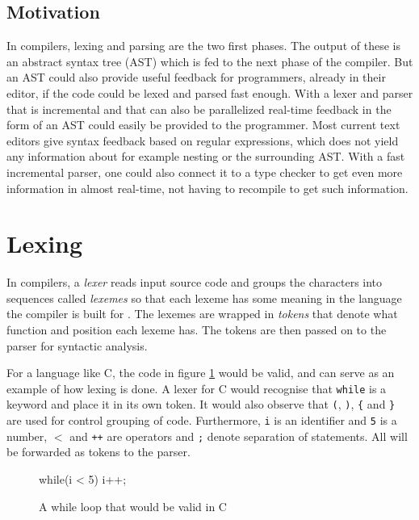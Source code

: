 \documentclass[a4paper,12pt,twosided]{report}
\renewcommand\cite{\citep}
\begin{document}
\subsection{Motivation}
In compilers, lexing and parsing are the two first phases. The output of these
is an abstract syntax tree (AST) which is fed to the next phase of the compiler.
But an AST could also provide useful feedback for programmers, already in their
editor, if the code could be lexed and parsed fast enough. With a lexer and
parser that is incremental and that can also be parallelized real-time feedback
in the form of an AST could easily be provided to the programmer. Most current
text editors give syntax feedback based on regular expressions, which does not
yield any information about for example nesting or the surrounding AST.  With a
fast incremental parser, one could also connect it to a type checker to get even
more information in almost real-time, not having to recompile to get such
information.

\section{Lexing}
In compilers, a \textit{lexer} reads input source code and groups the characters
into sequences called \textit{lexemes} so that each lexeme has some meaning in
the language the compiler is built for \cite[p. 5, p. 109]{dragonbook}. The
lexemes are wrapped in \textit{tokens} that denote what function and position
each lexeme has. The tokens are then passed on to the parser for syntactic
analysis.

For a language like C, the code in figure \ref{lexsample} would be valid, and
can serve as an example of how lexing is done.  A lexer for C would recognise
that \texttt{while} is a keyword and place it in its own token. It would also
observe that \texttt{(}, \texttt{)}, \texttt{\{} and \texttt{\}} are used for
control grouping of code. Furthermore, \texttt{i} is an identifier and
\texttt{5} is a number, \texttt{$<$} and \texttt{++} are operators and
\texttt{;} denote separation of statements. All will be forwarded as tokens to
the parser.

\begin{figure}[H]
\begin{code}
while(i < 5) {
    i++;
}
\end{code}
\caption{A while loop that would be valid in C}
\label{lexsample}
\end{figure}
\end{document}
